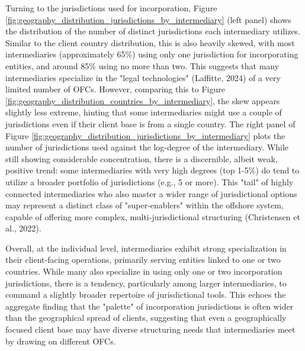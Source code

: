 Turning to the jurisdictions used for incorporation, Figure \ref{fig:geography_distribution_jurisdictions_by_intermediary} (left panel) shows the distribution of the number of distinct jurisdictions each intermediary utilizes. Similar to the client country distribution, this is also heavily skewed, with most intermediaries (approximately 65\%) using only one jurisdiction for incorporating entities, and around 85\% using no more than two. This suggests that many intermediaries specialize in the "legal technologies" (Laffitte, 2024) of a very limited number of OFCs. However, comparing this to Figure \ref{fig:geography_distribution_countries_by_intermediary}, the skew appears slightly less extreme, hinting that some intermediaries might use a couple of jurisdictions even if their client base is from a single country. The right panel of Figure \ref{fig:geography_distribution_jurisdictions_by_intermediary} plots the number of jurisdictions used against the log-degree of the intermediary. While still showing considerable concentration, there is a discernible, albeit weak, positive trend: some intermediaries with very high degrees (top 1-5\%) do tend to utilize a broader portfolio of jurisdictions (e.g., 5 or more). This "tail" of highly connected intermediaries who also master a wider range of jurisdictional options may represent a distinct class of "super-enablers" within the offshore system, capable of offering more complex, multi-jurisdictional structuring (Christensen et al., 2022).

Overall, at the individual level, intermediaries exhibit strong specialization in their client-facing operations, primarily serving entities linked to one or two countries. While many also specialize in using only one or two incorporation jurisdictions, there is a tendency, particularly among larger intermediaries, to command a slightly broader repertoire of jurisdictional tools. This echoes the aggregate finding that the "palette" of incorporation jurisdictions is often wider than the geographical spread of clients, suggesting that even a geographically focused client base may have diverse structuring needs that intermediaries meet by drawing on different OFCs.

